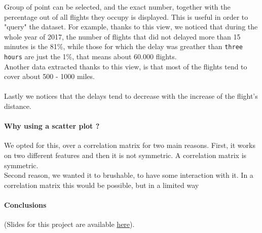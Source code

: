 \documentclass[a4paper, 12pt]{article}
\begin{document}
Group of point can be selected, and the exact number, together with the percentage out of all flights they occupy is displayed. This is useful in order to "query" the dataset. For example, thanks to this view, we noticed that during the whole year of 2017, the number of flights that did not delayed more than 15 minutes is the 81\%, while those for which the delay was greather than \texttt{three hours} are just the 1\%, that means about 60.000 flights.\\
Another data extracted thanks to this view, is that most of the flights tend to cover about 500 - 1000 miles.\\\\
Lastly we notices that the delays tend to decrease with the increase of the flight's distance. 
\paragraph{Why using a scatter plot ?}
We opted for this, over a correlation matrix for two main reasons. First, it works on two different features and then it is not symmetric. A correlation matrix is symmetric.\\
Second reason, we wanted it to brushable, to have some interaction with it. In a correlation matrix this would be possible, but in a limited way



\paragraph*{Conclusions}

(Slides for this project are available \href{https://docs.google.com/presentation/d/1T_p1oarqUuNt5APTaf7IwTJEzUDJC0CoNfJKHdak0so/edit?usp=sharing}{here}).
\end{document}
